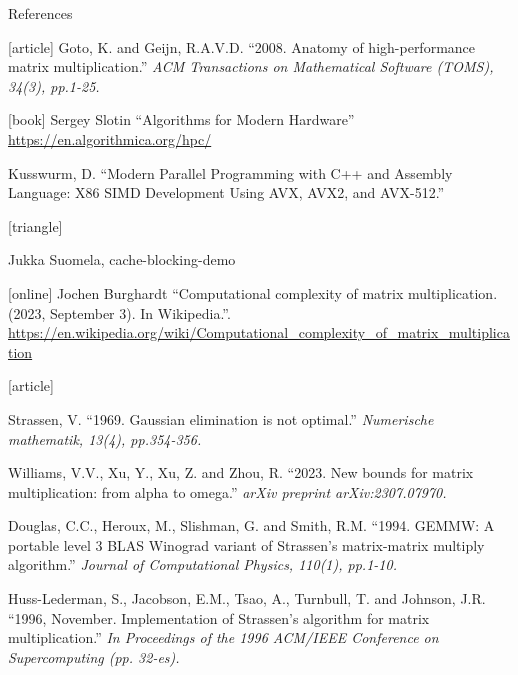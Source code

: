 \documentclass[UKenglish]{beamer}
\begin{document}
\begin{frame}[allowframebreaks]{References}
    \tiny
    \begin{thebibliography}{}
        [article]
        Goto, K. and Geijn, R.A.V.D.
        \newblock \enquote{2008. Anatomy of high-performance matrix
            multiplication.}
        \newblock \emph{ACM Transactions on Mathematical Software (TOMS),
            34(3), pp.1-25.}

        [book]
        Sergey Slotin
        \newblock \enquote{Algorithms for Modern Hardware}
        \newblock \url{https://en.algorithmica.org/hpc/}

        Kusswurm, D.
        \newblock \enquote{Modern Parallel Programming with C++ and Assembly
            Language: X86 SIMD Development Using AVX, AVX2, and AVX-512.}

        [triangle]

        Jukka Suomela, cache-blocking-demo

        [online]
        Jochen Burghardt
        \newblock \enquote{Computational complexity of matrix multiplication.
            (2023, September 3). In Wikipedia.}.
        \newblock
        \url{https://en.wikipedia.org/wiki/Computational_complexity_of_matrix_multiplication}

        [article]

        Strassen, V.
        \newblock \enquote{1969. Gaussian elimination is not optimal.}
        \newblock \emph{Numerische mathematik, 13(4), pp.354-356.}

        Williams, V.V., Xu, Y., Xu, Z. and Zhou, R.
        \newblock \enquote{2023. New bounds for matrix multiplication: from
            alpha to omega.}
        \newblock \emph{arXiv preprint arXiv:2307.07970.}

        Douglas, C.C., Heroux, M., Slishman, G. and Smith, R.M.
        \newblock \enquote{1994. GEMMW: A portable level 3 BLAS Winograd
            variant of Strassen's matrix-matrix multiply algorithm.}
        \newblock \emph{Journal of Computational Physics, 110(1), pp.1-10.}

        Huss-Lederman, S., Jacobson, E.M., Tsao, A., Turnbull, T. and Johnson,
        J.R.
        \newblock \enquote{1996, November. Implementation of Strassen's
            algorithm for matrix multiplication.}
        \newblock \emph{In Proceedings of the 1996 ACM/IEEE Conference on
            Supercomputing (pp. 32-es).}


\end{thebibliography}
\end{frame}
\end{document}
